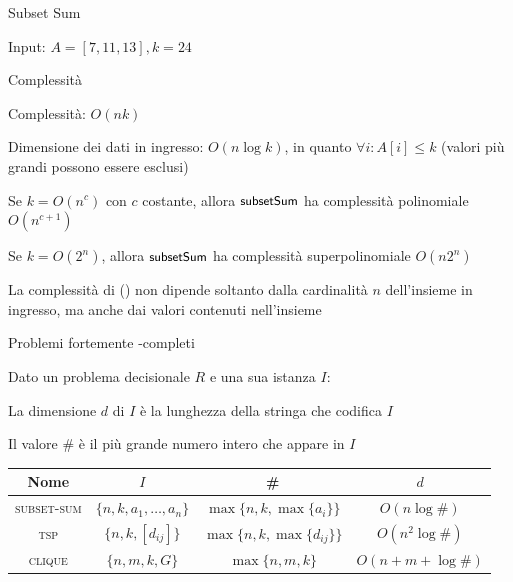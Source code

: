 \begin{frame}{Subset Sum}

Input: $A = [7, 11, 13], k=24$

\bigskip
{}

\end{frame}

\begin{frame}{Complessità}

\vspace{-9pt}
\begin{myboxtitle}
\BIL
\item Complessità: $O(nk)$
\item Dimensione dei dati in ingresso: $O(n \log k)$, in quanto $\forall i: A[i] \leq k$ (valori più grandi possono essere esclusi)
\item Se $k = O(n^c)$ con $c$ costante, allora $\textsf{{\small subsetSum}}$ ha complessità
polinomiale $O(n^{c+1})$
\item Se $k = O(2^n)$, allora $\textsf{{\small subsetSum}}$ ha complessità superpolinomiale
$O(n2^n)$
\EIL
\end{myboxtitle}

\begin{myboxtitle}[Osservazione]
La complessità di \subsetsum() non dipende soltanto dalla 
cardinalità $n$ dell'insieme in ingresso, ma anche dai valori contenuti
nell'insieme
\end{myboxtitle}

\end{frame}

\begin{frame}{Problemi fortemente \NP-completi}

\vspace{-9pt}
\begin{myboxtitle}
Dato un problema decisionale $R$ e una sua istanza $I$:
\BIL
\item La \alert{dimensione $d$} di $I$ è la lunghezza della stringa che codifica $I$
\item Il \alert{valore \#} è il più grande numero intero che appare in $I$
\EIL
\end{myboxtitle}

\bigskip
{}
\medskip
\small
\begin{tabular}{|c|c|c|c|}
\hline
\textbf{Nome} & $I$ & \# & $d$ \\\hline
\textsc{subset-sum} & $ \{n, k, a_1, \ldots, a_n\}$ & $\max\{n, k, \max \{ a_i \}\}$ & $O(n \log \#)$ \\\hline
\textsc{tsp} & $\{n, k, [d_{ij}]\}$ & $\max\{n, k, \max \{ d_{ij} \}\}$ &
$O(n^2 \log \#)$ \\\hline
\textsc{clique} & $\{n, m, k, G \}$ & $\max\{n, m, k\}$ & $O(n + m+ \log\#)$\\\hline
\end{tabular}

\end{frame}

